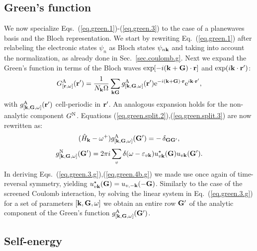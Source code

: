 \documentclass[twocolumn,prb,showpacs,superscriptaddress]{revtex4}
\def\w{\omega}
\def\H{\hat{H}}
\def\E{\varepsilon}
\def\k{{\bf k}}
\def\G{{\bf G}}
\def\Gp{{\bf G^\prime}}
\def\r{{\bf r}}
\def\rp{{\bf r^\prime}}
\begin{document}
\subsection{Green's function}\label{sec.green.g}

We now specialize Eqs.\ (\ref{eq.green.1})-(\ref{eq.green.3}) to the case
of a planewaves basis and the Bloch representation.
We start by rewriting Eq.\ (\ref{eq.green.1}) after relabeling the electronic states
$\psi_n$ as Bloch states $\psi_{n\k}$ and taking into account the
normalization, as already done in Sec.\ \ref{sec.coulomb.g}.
Next we expand the Green's function in terms
of the Bloch waves ${\rm exp}[-i(\k+\G)\cdot\r]$ and ${\rm exp}(i\k\cdot\rp)$:
  \begin{equation}\label{eq.green.bloch}
  G^{\rm A}_{[\r,\w]} (\rp) = \frac{1}{N_\k\Omega}  \sum_{\k\G} g^{\rm A}_{[\k,\G,\w]}(\rp)
   {\rm e}^{-i(\k+\G)\cdot\r} {\rm e}^{i\k\cdot\rp},
  \end{equation}
with $g^{\rm A}_{[\k,\G,\w]}(\rp)$ cell-periodic in $\rp$. An analogous expansion
holds for the non-analytic component $G^{\rm N}$.
Equations (\ref{eq.green.split.2}),(\ref{eq.green.split.3}) are now rewritten as:
  \begin{equation}\label{eq.green.3.g}
   (\H_\k-\w^+)  g^{\rm A}_{[\k,\G,\w]}(\Gp)  =  -\,\delta_{\G\Gp},
  \end{equation}
  \begin{equation} \label{eq.green.4b.g}
  g^{\rm N}_{[\k,\G,\w]}(\Gp)  =  
  2\pi i \sum_v \delta(\w-\E_{v\k}) u^\star_{v\k}(\G)u_{v\k} (\Gp).
  \end{equation}
In deriving Eqs.\ (\ref{eq.green.3.g}),(\ref{eq.green.4b.g}) we made use once again
of time-reversal symmetry, yielding
$u^\star_{v\k}(\G) = u_{v,-\k}(-\G)$.
Similarly to the case of the screened Coulomb interaction, by solving the
linear system in Eq.\ (\ref{eq.green.3.g}) for a set of parameters $[\k,\G,\w]$ 
we obtain an entire row $\Gp$ of the analytic component of the
Green's function $g^{\rm A}_{[\k,\G,\w]}(\Gp)$.

\subsection{Self-energy}\label{sec.sigma.g}
\end{document}
